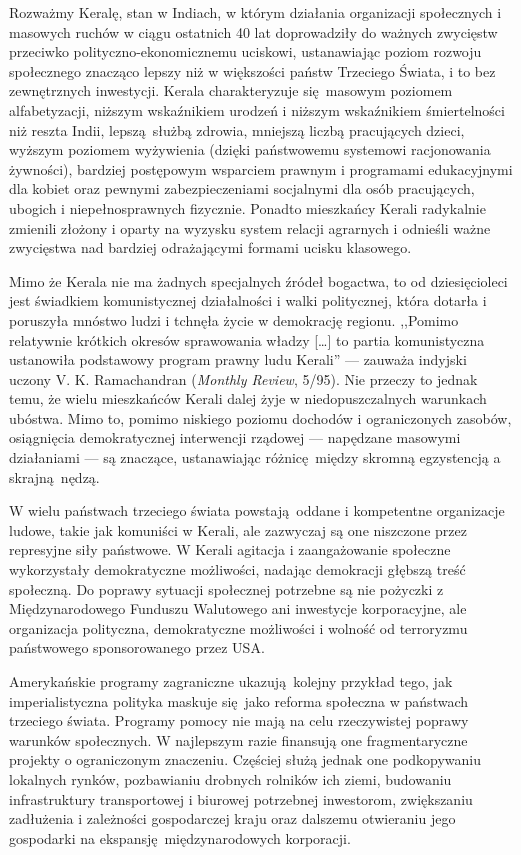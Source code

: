 \documentclass[12pt]{book}
\begin{document}
Rozważmy Keralę, stan w Indiach, w którym działania organizacji społecznych i masowych ruchów w ciągu ostatnich 40 lat doprowadziły do ważnych zwycięstw przeciwko polityczno-ekonomicznemu uciskowi, ustanawiając poziom rozwoju społecznego znacząco lepszy niż w większości państw Trzeciego Świata, i to bez zewnętrznych inwestycji. Kerala charakteryzuje się masowym poziomem alfabetyzacji, niższym wskaźnikiem urodzeń i niższym wskaźnikiem śmiertelności niż reszta Indii, lepszą służbą zdrowia, mniejszą liczbą pracujących dzieci, wyższym poziomem wyżywienia (dzięki państwowemu systemowi racjonowania żywności), bardziej postępowym wsparciem prawnym i programami edukacyjnymi dla kobiet oraz pewnymi  zabezpieczeniami socjalnymi dla osób pracujących, ubogich i niepełnosprawnych fizycznie. Ponadto mieszkańcy Kerali radykalnie zmienili złożony i oparty na wyzysku system relacji agrarnych i odnieśli ważne zwycięstwa nad bardziej odrażającymi formami ucisku klasowego.

Mimo że Kerala nie ma żadnych specjalnych źródeł bogactwa, to od dziesięcioleci jest świadkiem komunistycznej działalności i walki politycznej, która dotarła i poruszyła mnóstwo ludzi i tchnęła życie w demokrację regionu. ,,Pomimo relatywnie krótkich okresów sprawowania władzy [\ldots] to partia komunistyczna ustanowiła podstawowy program prawny ludu Kerali'' — zauważa indyjski uczony V. K. Ramachandran (\textit{Monthly Review}, 5/95). Nie przeczy to jednak temu, że wielu mieszkańców Kerali dalej żyje w niedopuszczalnych warunkach ubóstwa. Mimo to, pomimo niskiego poziomu dochodów i ograniczonych zasobów, osiągnięcia demokratycznej interwencji rządowej — napędzane masowymi działaniami — są znaczące, ustanawiając różnicę między skromną egzystencją a skrajną nędzą.

W wielu państwach trzeciego świata powstają oddane i kompetentne organizacje ludowe, takie jak komuniści w Kerali, ale zazwyczaj są one niszczone przez represyjne siły państwowe. W Kerali agitacja i zaangażowanie społeczne wykorzystały demokratyczne możliwości, nadając demokracji głębszą treść społeczną. Do poprawy sytuacji społecznej potrzebne są nie pożyczki z Międzynarodowego Funduszu Walutowego ani inwestycje korporacyjne, ale organizacja polityczna, demokratyczne możliwości i wolność od terroryzmu państwowego sponsorowanego przez USA.

Amerykańskie programy zagraniczne ukazują kolejny przykład tego, jak imperialistyczna polityka maskuje się jako reforma społeczna w państwach trzeciego świata. Programy pomocy nie mają na celu rzeczywistej poprawy warunków społecznych. W najlepszym razie finansują one fragmentaryczne projekty o ograniczonym znaczeniu. Częściej służą jednak one podkopywaniu lokalnych rynków, pozbawianiu drobnych rolników ich ziemi, budowaniu infrastruktury transportowej i biurowej potrzebnej inwestorom, zwiększaniu zadłużenia i zależności gospodarczej kraju oraz dalszemu otwieraniu jego gospodarki na ekspansję międzynarodowych korporacji.
\end{document}
